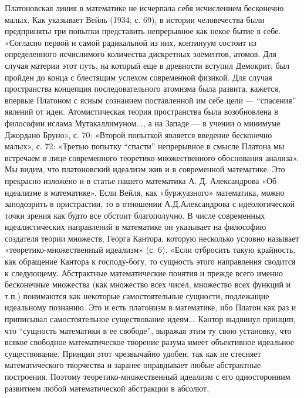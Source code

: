 Платоновская  линия   в  математике  не  исчерпала   себя  исчислением
бесконечно  малых.  Как  указывает  Вейль (1934,  с.  69),  в  истории
человечества были предприняты три  попытки представить непрерывное как
некое  бытие в  себе. «Согласно  первой  и самой  радикальной из  них,
континуум состоит  из определенного исчислимого  количества дискретных
элементов,  атомов.  Для случая  материи  этот  путь, на  который  еще
в  древности  вступил  Демокрит,  был пройден  до  конца  с  блестящим
успехом  современной   физикой.  Для  случая   пространства  концепция
последовательного атомизма  была развита, кажется, впервые  Платоном с
ясным сознанием поставленной им себе  цели --- ``спасения'' явлений от
идеи. Атомистическая теория пространства была возобновлена в философии
ислама  Мутакаллимуном...,  а  на  Западе  ---  в  учении  о  минимуме
Джордано Бруно», с. 70:  «Второй попыткой является введение бесконечно
малых»,  с.  72:  «Третью  попытку  ``спасти''  непрерывное  в  смысле
Платона  мы  встречаем  в лице  современного  теоретико-множественного
обоснования  анализа». Мы  видим, что  платоновский идеализм  жив и  в
современной  математике.  Это прекрасно  изложено  и  в статье  нашего
математика  А.  Д.  Александрова  «Об идеализме  в  математике».  Если
Вейля, как «буржуазного» математика,  можно заподозрить в пристрастии,
то  в отношении  А.Д.Александрова  с идеологической  точки зрения  как
будто все  обстоит благополучно.  В числе  современных идеалистических
направлений  в   математике  он   указывает  на   философию  создателя
теории множеств,  Георга Кантора,  которую несколько  условно называет
«теоретико-множественный  идеализм»  (с.  6).  «Если  отбросить  такую
крайность,  как обращение  Кантора к  господу-богу, то  сущность этого
направления сводится к  следующему. Абстрактные математические понятия
и  прежде  всего  именно  бесконечные множества  (как  множество  всех
чисел,  множество  всех  функций  и  т.п.)  понимаются  как  некоторые
самостоятельные  сущности,  подлежащие   идеальному  познанию.  Это  и
есть  платонизм  в  математике,  ибо   Платон  как  раз  и  приписывал
самостоятельное  существование идеям...  Кантор выдвинул  принцип, что
``сущность математики в ее свободе'',  выражая этим ту свою установку,
что всякое свободное математическое  творение разума имеет объективное
идеальное  существование. Принцип  этот  чрезвычайно  удобен, так  как
не  стесняет математического  творчества и  заранее оправдывает  любые
абстрактные построения. Поэтому теоретико-множественный идеализм с его
односторонним  развитием любой  математической  абстракции в  абсолют,
